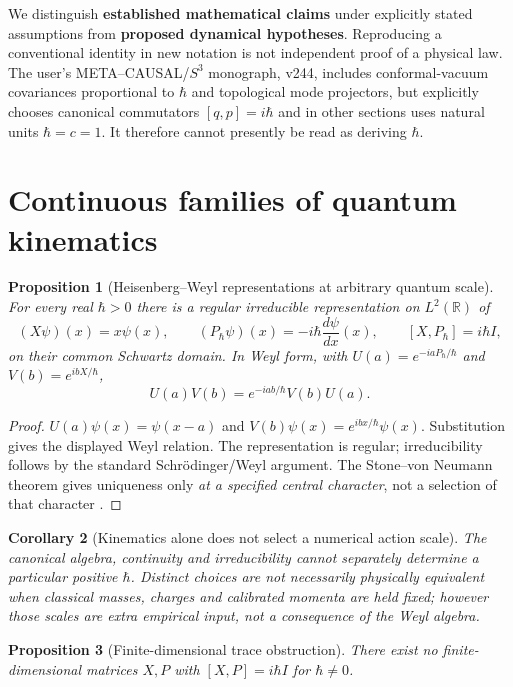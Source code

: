 \documentclass[11pt,a4paper]{article}
\newtheorem{proposition}{Proposition}[section]
\newtheorem{corollary}[proposition]{Corollary}
\newcommand{\h}{\hbar}
\newcommand{\R}{\mathbb R}
\begin{document}
We distinguish \textbf{established mathematical claims} under explicitly stated assumptions from \textbf{proposed dynamical hypotheses}. Reproducing a conventional identity in new notation is not independent proof of a physical law. The user's META--CAUSAL/$S^3$ monograph, v244, includes conformal-vacuum covariances proportional to $\h$ and topological mode projectors, but explicitly chooses canonical commutators $[q,p]=i\h$ and in other sections uses natural units $\h=c=1$. It therefore cannot presently be read as deriving $\h$.

\section{Continuous families of quantum kinematics}
\begin{proposition}[Heisenberg--Weyl representations at arbitrary quantum scale]\label{pr:weyl}
For every real $\h>0$ there is a regular irreducible representation on $L^2(\R)$ of
\begin{equation}\label{eq:CCR}
  (X\psi)(x)=x\psi(x),\qquad (P_{\h}\psi)(x)=-i\h\frac{d\psi}{dx}(x),\qquad
  [X,P_{\h}]=i\h I,
\end{equation}
on their common Schwartz domain. In Weyl form, with $U(a)=e^{-iaP_\h/\h}$ and $V(b)=e^{ibX/\h}$,
\begin{equation}\label{eq:weyl}
 U(a)V(b)=e^{-iab/\h}V(b)U(a).
\end{equation}
\end{proposition}
\begin{proof} $U(a)\psi(x)=\psi(x-a)$ and $V(b)\psi(x)=e^{ibx/\h}\psi(x)$. Substitution gives the displayed Weyl relation. The representation is regular; irreducibility follows by the standard Schr\"odinger/Weyl argument. The Stone--von Neumann theorem gives uniqueness only \emph{at a specified central character}, not a selection of that character \cite{Hall}.\end{proof}
\begin{corollary}[Kinematics alone does not select a numerical action scale]
The canonical algebra, continuity and irreducibility cannot separately determine a particular positive $\h$. Distinct choices are not necessarily physically equivalent when classical masses, charges and calibrated momenta are held fixed; however those scales are extra empirical input, not a consequence of the Weyl algebra.
\end{corollary}
\begin{proposition}[Finite-dimensional trace obstruction]
There exist no finite-dimensional matrices $X,P$ with $[X,P]=i\h I$ for $\h\ne0$.
\end{proposition}
\end{document}
